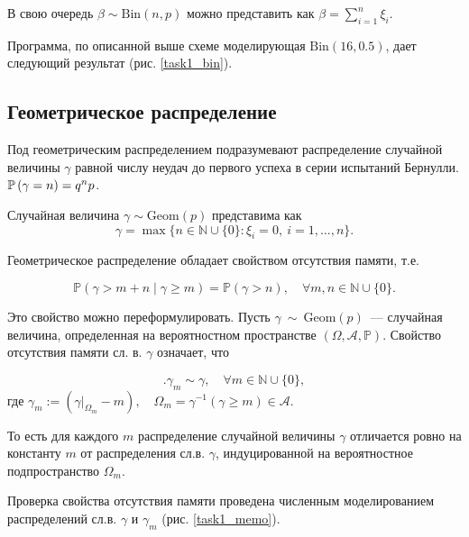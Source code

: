         В свою очередь $\beta \sim \mathrm{Bin}(n,p)$ можно представить как 
        $\beta = \sum\limits_{i=1}^{n} \xi_i$.

        Программа, по описанной выше схеме моделирующая $\mathrm{Bin}(16,0.5)$, 
        дает следующий результат (рис. \ref{task1_bin}).
        
    \subsection{Геометрическое распределение} \label{par12}
        Под геометрическим распределением подразумевают распределение случайной 
        величины $\gamma$ равной числу неудач до первого успеха в серии 
        испытаний Бернулли. $\mathbb{P}\left(\gamma = n\right) = q^n p$.

        Случайная величина $\gamma \sim \mathrm{Geom}(p)$ представима как 
        \[\gamma = \max\{n \in \mathbb{N} \cup \{0\} : 
        \xi_i = 0,\:i = 1,\ldots,n\}.\]

        Геометрическое распределение обладает свойством отсутствия памяти, т.е.

        \[\mathbb{P}(\gamma > m + n \mid \gamma \ge m) = \mathbb{P}(\gamma > n), 
        \quad\forall{m,n} \in \mathbb{N} \cup \{0\}.\]

        Это свойство можно переформулировать. Пусть 
        $\gamma~\sim~\mathrm{Geom}(p)$~--- случайная величина, определенная на 
        вероятностном пространстве $\left(\Omega,\mathcal{A},\mathbb{P}\right)$.
        Свойство отсутствия памяти сл. в. $\gamma$ означает, что
        \smallskip

        \[\bigl. \gamma_m \sim \gamma ,\quad 
        \forall{m} \in \mathbb{N} \cup \{0\},\]
        где $\gamma_m := (\gamma \bigr|_{\Omega_m} - m), 
        \quad \Omega_m = \gamma^{-1}(\gamma \geqslant m) \in \mathcal{A}.$ 

        То есть для каждого $m$ распределение случайной величины $\gamma$ 
        отличается ровно на константу $m$ от распределения сл.в. $\gamma$, 
        индуцированной на вероятностное подпространство $\Omega_m$.

        Проверка свойства отсутствия памяти проведена численным моделированием 
        распределений сл.в. $\gamma$ и $\gamma_m$ (рис. \ref{task1_memo}).
        

